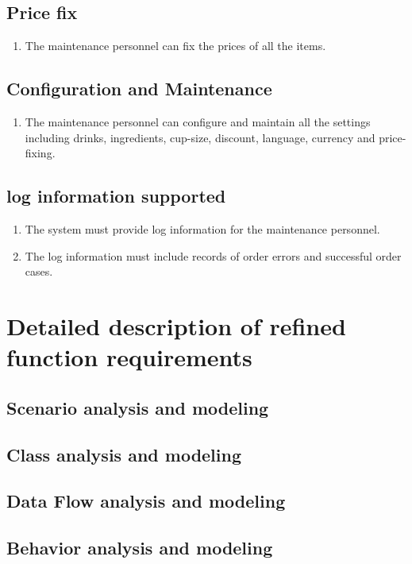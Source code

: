 \documentclass[a4paper]{report}
\begin{document}
\subsection{Price fix}
\begin{enumerate}
\item The maintenance personnel can fix the prices of all the items.
\end{enumerate}

\subsection{Configuration and Maintenance}
\begin{enumerate}
\item The maintenance personnel can configure and maintain all the settings including drinks, ingredients, cup-size, discount, language, currency and price-fixing.

\end{enumerate}

\subsection{log information supported}
\begin{enumerate}
\item The system must provide log information for the maintenance personnel.
\item The log information must include records of order errors and successful order cases.
\end{enumerate}


\section{Detailed description of refined function requirements}
\subsection{Scenario analysis and modeling}
\subsection{Class analysis and modeling}
\subsection{Data Flow analysis and modeling}
\subsection{Behavior analysis and modeling}
\end{document}
